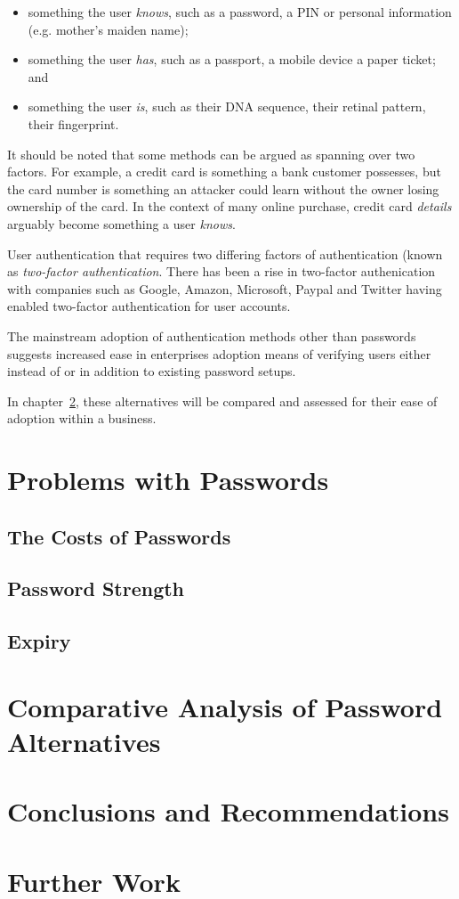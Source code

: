 \documentclass{report}
\begin{document}
\begin{itemize}
  \item something the user \emph{knows}, such as a password, a PIN or
    personal information (e.g. mother's maiden name);
  \item something the user \emph{has}, such as a passport, a mobile device
    a paper ticket; and
  \item something the user \emph{is}, such as their DNA sequence,
    their retinal pattern, their fingerprint.
\end{itemize}

It should be noted that some methods can be argued as spanning
over two factors. For example, a credit card is something
a bank customer possesses, but the card number is something
an attacker could learn without the owner losing ownership
of the card. In the context of many online purchase, credit
card \emph{details} arguably become something a user \emph{knows}.

User authentication that requires two differing factors
of authentication (known as \emph{two-factor authentication}. There
has been a rise in two-factor authenication with companies
such as Google, Amazon, Microsoft, Paypal and Twitter having enabled
two-factor authentication for user accounts.

The mainstream adoption of authentication methods other than
passwords suggests increased ease in enterprises adoption means
of verifying users either instead of or in addition to
existing password setups.

In chapter~\ref{chapter:alternatives}, these alternatives will be
compared and assessed for their ease of adoption within a business.

\chapter{Problems with Passwords}
\label{chapter:costs}

\section{The Costs of Passwords}
\section{Password Strength}
\section{Expiry}

\chapter{Comparative Analysis of Password Alternatives}
\label{chapter:alternatives}

\chapter{Conclusions and Recommendations}

\chapter{Further Work}

\printbibliography
\end{document}

